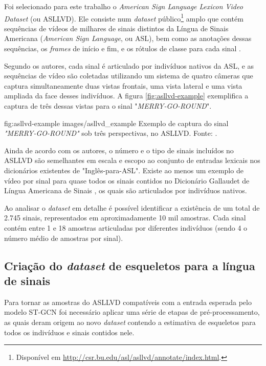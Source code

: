 Foi selecionado para este trabalho o \textit{American Sign Language Lexicon Video Dataset} (ou ASLLVD). Ele consiste num \textit{dataset} público\footnote{
    Disponível em \url{http://csr.bu.edu/asl/asllvd/annotate/index.html}.
} amplo que contém sequências de vídeos de milhares de sinais distintos da Língua de Sinais Americana (\textit{American Sign Language}, ou ASL), bem como as anotações dessas sequências, os \textit{frames} de início e fim, e os rótulos de classe para cada sinal \cite{athitsos-asllvd-2008, neidle-2012, vloger-2012}.

Segundo os autores, cada sinal é articulado por indivíduos nativos da ASL, e as sequências de vídeo são coletadas utilizando um sistema de quatro câmeras que captura simultaneamente duas vistas frontais, uma vista lateral e uma vista ampliada da face desses indivíduos. A figura \ref{fig:asllvd-example} exemplifica a captura de três dessas vistas para o sinal "\textit{MERRY-GO-ROUND}".

\image
    {fig:asllvd-example}
    {images/asllvd_example}
    {Exemplo de captura do sinal \textit{"MERRY-GO-ROUND"} sob três perspectivas, no ASLLVD. Fonte:  \cite[p. 2]{athitsos-asllvd-2008}.}

Ainda de acordo com os autores, o número e o tipo de sinais incluídos no ASLLVD são semelhantes em escala e escopo ao conjunto de entradas lexicais nos dicionários existentes de "Inglês-para-ASL". Existe ao menos um exemplo de vídeo por sinal para quase todos os sinais contidos no Dicionário Gallaudet de Língua Americana de Sinais \cite{athitsos-asllvd-2008, gallaudet-2005}, os quais são articulados por indivíduos nativos. 

Ao analisar o \textit{dataset} em detalhe é possível identificar a existência de um total de 2.745 sinais, representados em aproximadamente 10 mil amostras. Cada sinal contém entre 1 e 18 amostras articuladas por diferentes indivíduos (sendo 4 o número médio de amostras por sinal).


\subsection{Criação do \textit{dataset} de esqueletos para a língua de sinais} %
\label{sec:criacao-dataset}

Para tornar as amostras do ASLLVD compatíveis com a entrada esperada pelo modelo ST-GCN foi necessário aplicar uma série de etapas de pré-processamento, as quais deram origem ao novo \textit{dataset} contendo a estimativa de esqueletos para todos os indivíduos e sinais contidos nele.

